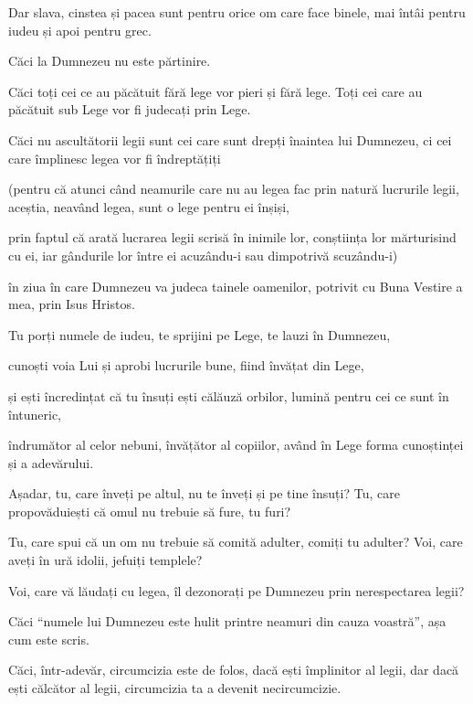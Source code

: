 {\par }{\PP {}Dar slava, cinstea și pacea sunt pentru orice om care face binele, mai întâi pentru iudeu și apoi pentru grec.

Căci la Dumnezeu nu este părtinire.

Căci toți cei ce au păcătuit fără lege vor pieri și fără lege. Toți cei care au păcătuit sub Lege vor fi judecați prin Lege.

Căci nu ascultătorii legii sunt cei care sunt drepți înaintea lui Dumnezeu, ci cei care împlinesc legea vor fi îndreptățiți

(pentru că atunci când neamurile care nu au legea fac prin natură lucrurile legii, aceștia, neavând legea, sunt o lege pentru ei înșiși,

prin faptul că arată lucrarea legii scrisă în inimile lor, conștiința lor mărturisind cu ei, iar gândurile lor între ei acuzându-i sau dimpotrivă scuzându-i)

în ziua în care Dumnezeu va judeca tainele oamenilor, potrivit cu Buna Vestire a mea, prin Isus Hristos.


\par }{\PP {}Tu porți numele de iudeu, te sprijini pe Lege, te lauzi în Dumnezeu,

cunoști voia Lui și aprobi lucrurile bune, fiind învățat din Lege,

și ești încredințat că tu însuți ești călăuză orbilor, lumină pentru cei ce sunt în întuneric,

îndrumător al celor nebuni, învățător al copiilor, având în Lege forma cunoștinței și a adevărului.

Așadar, tu, care înveți pe altul, nu te înveți și pe tine însuți? Tu, care propovăduiești că omul nu trebuie să fure, tu furi?

Tu, care spui că un om nu trebuie să comită adulter, comiți tu adulter? Voi, care aveți în ură idolii, jefuiți templele?

Voi, care vă lăudați cu legea, îl dezonorați pe Dumnezeu prin nerespectarea legii?

Căci “numele lui Dumnezeu este hulit printre neamuri din cauza voastră”, așa cum este scris.

Căci, într-adevăr, circumcizia este de folos, dacă ești împlinitor al legii, dar dacă ești călcător al legii, circumcizia ta a devenit necircumcizie.

}
